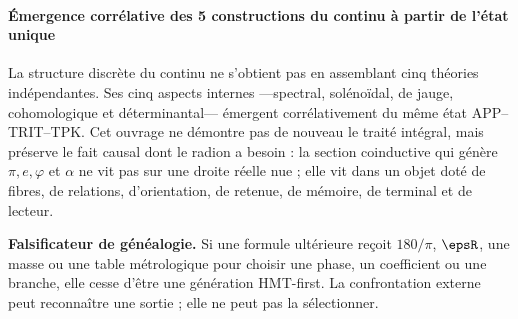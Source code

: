 \paragraph{Émergence corrélative des 5 constructions du continu à partir de l'état unique}

La structure discrète du continu ne s'obtient pas en assemblant cinq théories
indépendantes. Ses cinq aspects internes ---spectral, solénoïdal, de jauge,
cohomologique et déterminantal--- émergent corrélativement du même état
APP--TRIT--TPK. Cet ouvrage ne démontre pas de nouveau le traité intégral, mais
préserve le fait causal dont le radion a besoin : la section coinductive qui
génère \(\pi,e,\varphi\) et \(\alpha\) ne vit pas sur une droite réelle nue ; elle vit
dans un objet doté de fibres, de relations, d'orientation, de retenue, de mémoire, de terminal et de
lecteur.

\begin{statusbox}
\textbf{Falsificateur de généalogie.} Si une formule ultérieure reçoit
\(180/\pi\), \(\epsR\), une masse ou une table métrologique pour choisir une phase,
un coefficient ou une branche, elle cesse d'être une génération HMT-first. La confrontation
externe peut reconnaître une sortie ; elle ne peut pas la sélectionner.
\end{statusbox}

